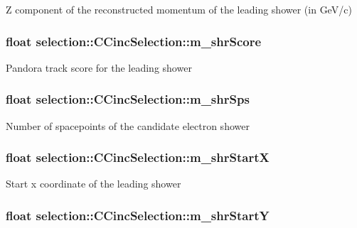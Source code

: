 Z component of the reconstructed momentum of the leading shower (in Ge\-V/c) \hypertarget{classselection_1_1CCincSelection_a4674f9b827098184a3daba78da7048a9}{
\subsubsection[{m\-\_\-shr\-Score}]{\setlength{\rightskip}{0pt plus 5cm}float selection\-::\-C\-Cinc\-Selection\-::m\-\_\-shr\-Score\hspace{0.3cm}{\ttfamily [private]}}}\label{classselection_1_1CCincSelection_a4674f9b827098184a3daba78da7048a9}
Pandora track score for the leading shower \hypertarget{classselection_1_1CCincSelection_a674a7e5b50475f3afa692bc7a47f5f22}{
\subsubsection[{m\-\_\-shr\-Sps}]{\setlength{\rightskip}{0pt plus 5cm}float selection\-::\-C\-Cinc\-Selection\-::m\-\_\-shr\-Sps\hspace{0.3cm}{\ttfamily [private]}}}\label{classselection_1_1CCincSelection_a674a7e5b50475f3afa692bc7a47f5f22}
Number of spacepoints of the candidate electron shower \hypertarget{classselection_1_1CCincSelection_a692099d6cabdf30bfd269f35c3193971}{
\subsubsection[{m\-\_\-shr\-Start\-X}]{\setlength{\rightskip}{0pt plus 5cm}float selection\-::\-C\-Cinc\-Selection\-::m\-\_\-shr\-Start\-X\hspace{0.3cm}{\ttfamily [private]}}}\label{classselection_1_1CCincSelection_a692099d6cabdf30bfd269f35c3193971}
Start x coordinate of the leading shower \hypertarget{classselection_1_1CCincSelection_a60b711d11ef5b1ce99992df868e900c7}{
\subsubsection[{m\-\_\-shr\-Start\-Y}]{\setlength{\rightskip}{0pt plus 5cm}float selection\-::\-C\-Cinc\-Selection\-::m\-\_\-shr\-Start\-Y\hspace{0.3cm}{\ttfamily [private]}}}\label{classselection_1_1CCincSelection_a60b711d11ef5b1ce99992df868e900c7}
